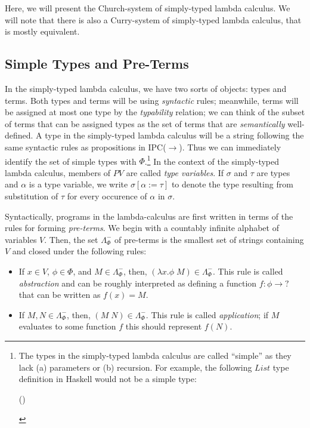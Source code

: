 \documentclass[12pt]{article}
\newcommand{\Conid}[1]{\mathit{#1}}
\newcommand{\Varid}[1]{\mathit{#1}}
\def\resethooks{%
  \global\let\SaveRestoreHook\empty
  \global\let\ColumnHook\empty}
\let\hspre\empty
\let\hspost\empty
\begin{document}
Here, we will present the Church-system of simply-typed lambda calculus. 
We will note that there is also a Curry-system of simply-typed lambda calculus,
that is mostly equivalent. 

\subsection{Simple Types and Pre-Terms}
In the simply-typed lambda calculus, we have two sorts of objects: types and terms. 
Both types and terms will be using \textit{syntactic} rules; 
meanwhile, terms will be assigned at most one type by the \textit{typability} relation;
we can think of the subset of terms that can be assigned types as the set of terms that are
\textit{semantically} well-defined.  
A type in the simply-typed lambda calculus will be a string following the same syntactic rules as propositions in IPC($\to$). 
Thus we can immediately identify the set of simple types with $\Phi$.\footnote{
The types in the simply-typed lambda calculus are called ``simple'' as they lack (a) parameters or (b) recursion. 
For example, the following \ensuremath{\Conid{List}} type definition in Haskell would not be a simple type: 
\begin{hscode}\SaveRestoreHook
\column{B}{@{}>{\hspre}l<{\hspost}@{}}%
\column{E}{@{}>{\hspre}l<{\hspost}@{}}%
\>[B]{}\Conid{List}\;\Varid{a}\mathrel{=}\Conid{Cons}\;\Varid{a}\;(\Conid{List}\;\Varid{a})\mid \Conid{Empty}{}\<[E]%
\ColumnHook
\end{hscode}\resethooks
} 
In the context of the simply-typed lambda calculus, members of $PV$ are called \textit{type variables}. 
If $\sigma$ and $\tau$ are types and $\alpha$ is a type variable, 
we write $\sigma[\alpha:=\tau]$ to denote the type resulting from substitution of $\tau$
for every occurence of $\alpha$ in $\sigma$. 

Syntactically, programs in the lambda-calculus are first written in terms of the rules for forming \textit{pre-terms}. 
We begin with a countably infinite alphabet of variables $V$. 
Then, the set $\Lambda_\Phi^-$ of pre-terms is the smallest set of strings containing $V$ and closed under the following rules:
\begin{itemize}
\item If $x\in V$, $\phi\in\Phi$, and $M\in \Lambda_\Phi^-$, then, $(\lambda x .\phi \; M)\in \Lambda_\Phi^-$.
This rule is called \textit{abstraction} and can be roughly interpreted as defining a function $f\colon \phi\to \mathord{?}$ 
that can be written as $f(x) = M$. 
\item If $M,N\in \Lambda_\Phi^-$, then, $(M\; N)\in\Lambda_\Phi^-$. 
This rule is called \textit{application}; if $M$ evaluates to some function $f$ this should represent $f(N)$.  
\end{itemize}
\end{document}
